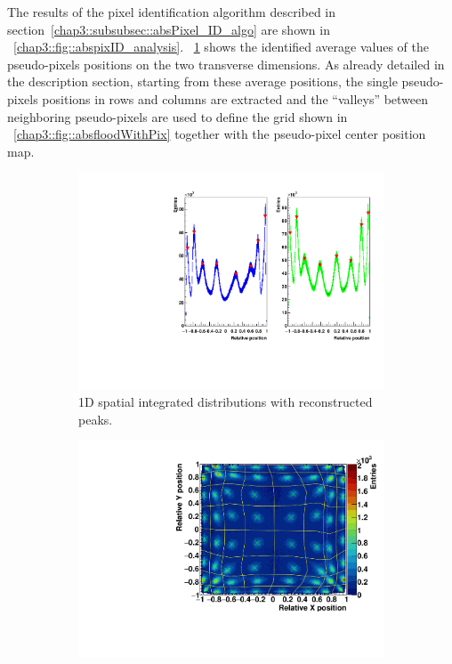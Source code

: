 The results of the pixel identification algorithm described in section~\ref{chap3::subsubsec::absPixel_ID_algo} are shown in \figurename~\ref{chap3::fig::abspixID_analysis}. \figurename~\ref{chap3::fig::abslineColID} shows the identified average values of the pseudo-pixels positions on the two transverse dimensions. As already detailed in the description section, starting from these average positions, the single pseudo-pixels positions in rows and columns are extracted and the \enquote{valleys} between neighboring pseudo-pixels are used to define the grid shown in \figurename~\ref{chap3::fig::absfloodWithPix} together with the pseudo-pixel center position map.\\
\begin{figure}
\begin{subfigure}[t]{0.5\textwidth}
\centering
\includegraphics[width=1\textwidth]{03_GraphicFiles/chapter3_CLaRySproto/Absorber/images_charResults_Co60/3_Cal_XYProfiles_withPeaks.pdf}
\caption{1D spatial integrated distributions with reconstructed peaks.}
\label{chap3::fig::abslineColID}
\end{subfigure}
\begin{subfigure}[t]{0.5\textwidth}
\centering
\includegraphics[width=1\textwidth]{03_GraphicFiles/chapter3_CLaRySproto/Absorber/images_charResults_Co60/3_Cal_FLOODMAP_pixels_Regions.pdf}

\end{subfigure}
\end{figure}
